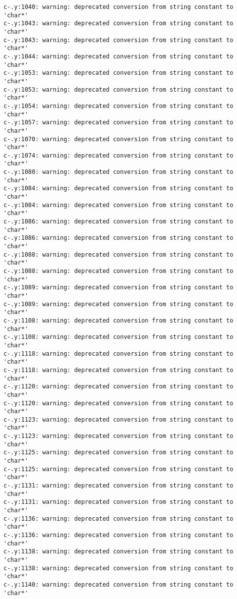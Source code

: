 \documentclass[12pt]{book}
\begin{document}
\begin{lstlisting}
c-.y:1040: warning: deprecated conversion from string constant to 'char*'
c-.y:1043: warning: deprecated conversion from string constant to 'char*'
c-.y:1043: warning: deprecated conversion from string constant to 'char*'
c-.y:1044: warning: deprecated conversion from string constant to 'char*'
c-.y:1053: warning: deprecated conversion from string constant to 'char*'
c-.y:1053: warning: deprecated conversion from string constant to 'char*'
c-.y:1054: warning: deprecated conversion from string constant to 'char*'
c-.y:1057: warning: deprecated conversion from string constant to 'char*'
c-.y:1070: warning: deprecated conversion from string constant to 'char*'
c-.y:1074: warning: deprecated conversion from string constant to 'char*'
c-.y:1080: warning: deprecated conversion from string constant to 'char*'
c-.y:1084: warning: deprecated conversion from string constant to 'char*'
c-.y:1084: warning: deprecated conversion from string constant to 'char*'
c-.y:1086: warning: deprecated conversion from string constant to 'char*'
c-.y:1086: warning: deprecated conversion from string constant to 'char*'
c-.y:1088: warning: deprecated conversion from string constant to 'char*'
c-.y:1088: warning: deprecated conversion from string constant to 'char*'
c-.y:1089: warning: deprecated conversion from string constant to 'char*'
c-.y:1089: warning: deprecated conversion from string constant to 'char*'
c-.y:1108: warning: deprecated conversion from string constant to 'char*'
c-.y:1108: warning: deprecated conversion from string constant to 'char*'
c-.y:1118: warning: deprecated conversion from string constant to 'char*'
c-.y:1118: warning: deprecated conversion from string constant to 'char*'
c-.y:1120: warning: deprecated conversion from string constant to 'char*'
c-.y:1120: warning: deprecated conversion from string constant to 'char*'
c-.y:1123: warning: deprecated conversion from string constant to 'char*'
c-.y:1123: warning: deprecated conversion from string constant to 'char*'
c-.y:1125: warning: deprecated conversion from string constant to 'char*'
c-.y:1125: warning: deprecated conversion from string constant to 'char*'
c-.y:1131: warning: deprecated conversion from string constant to 'char*'
c-.y:1131: warning: deprecated conversion from string constant to 'char*'
c-.y:1136: warning: deprecated conversion from string constant to 'char*'
c-.y:1136: warning: deprecated conversion from string constant to 'char*'
c-.y:1138: warning: deprecated conversion from string constant to 'char*'
c-.y:1138: warning: deprecated conversion from string constant to 'char*'
c-.y:1140: warning: deprecated conversion from string constant to 'char*'

\end{lstlisting}
\end{document}
